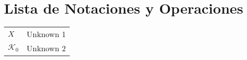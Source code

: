 \chapter*{Lista de Notaciones y Operaciones}\label{LstSym}

\begin{flushleft}
\begin{longtable}{lp{12cm}}
	
$X$ & Unknown 1\\
$\mathcal{K}_0$ & Unknown 2\\


\end{longtable}
\end{flushleft}

